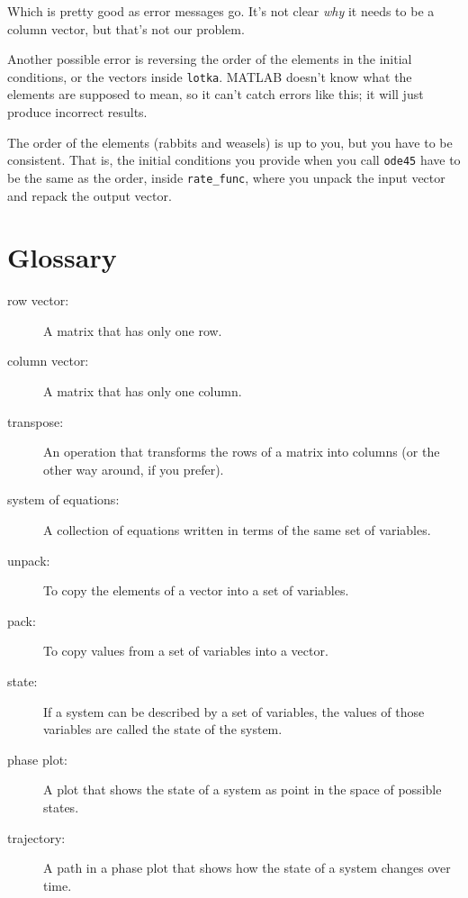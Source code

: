 \documentclass[
]{book}
\numberwithin{Answer}{chapter}
\numberwithin{Exercise}{chapter}
\begin{document}
Which is pretty good as error messages go.  It's not clear {\em why}
it needs to be a column vector, but that's not our problem.

Another possible error is reversing the order of the elements in the
initial conditions, or the vectors inside {\tt lotka}.  MATLAB
doesn't know what the elements are supposed to mean, so it can't catch
errors like this; it will just produce incorrect results.

The order of the elements (rabbits and weasels) is up to you, but
you have to be consistent.  That is, the initial conditions you
provide when you call {\tt ode45} have to be the same as the order,
inside \verb"rate_func", where you unpack the input vector and repack
the output vector.



\section{Glossary}

\begin{description}

\item[row vector:] A matrix that has only one row.

\item[column vector:] A matrix that has only one column.

\item[transpose:] An operation that transforms the rows of a matrix
into columns (or the other way around, if you prefer).

\item[system of equations:] A collection of equations written in terms of
the same set of variables.

\item[unpack:] To copy the elements of a vector into a set of variables.

\item[pack:] To copy values from a set of variables into a vector.

\item[state:] If a system can be described by a set of variables,
the values of those variables are called the state of the system.

\item[phase plot:] A plot that shows the state of a system as point
in the space of possible states.

\item[trajectory:] A path in a phase plot that shows how the state of
a system changes over time.


\end{description}
\end{document}
